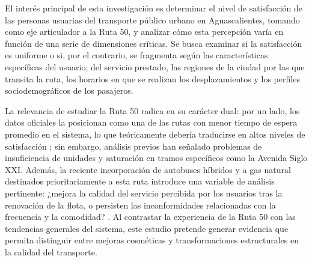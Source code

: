 \documentclass{article}
\begin{document}
El interés principal de esta investigación es determinar el nivel de satisfacción de las personas usuarias del transporte público urbano en Aguascalientes, tomando como eje articulador a la Ruta 50, y analizar cómo esta percepción varía en función de una serie de dimensiones críticas. Se busca examinar si la satisfacción es uniforme o si, por el contrario, se fragmenta según las características específicas del usuario; del servicio prestado, las regiones de la ciudad por las que transita la ruta, los horarios en que se realizan los desplazamientos y los perfiles sociodemográficos de los pasajeros. %

La relevancia de estudiar la Ruta 50 radica en su carácter dual: por un lado, los datos oficiales la posicionan como una de las rutas con menor tiempo de espera promedio en el sistema, lo que teóricamente debería traducirse en altos niveles de satisfacción ; sin embargo, análisis previos han señalado problemas de insuficiencia de unidades y saturación en tramos específicos como la Avenida Siglo XXI. Además, la reciente incorporación de autobuses híbridos y a gas natural destinados prioritariamente a esta ruta introduce una variable de análisis pertinente: ¿mejora la calidad del servicio percibida por los usuarios tras la renovación de la flota, o persisten las inconformidades relacionadas con la frecuencia y la comodidad? . Al contrastar la experiencia de la Ruta 50 con las tendencias generales del sistema, este estudio pretende generar evidencia que permita distinguir entre mejoras cosméticas y transformaciones estructurales en la calidad del transporte.

\end{document}

